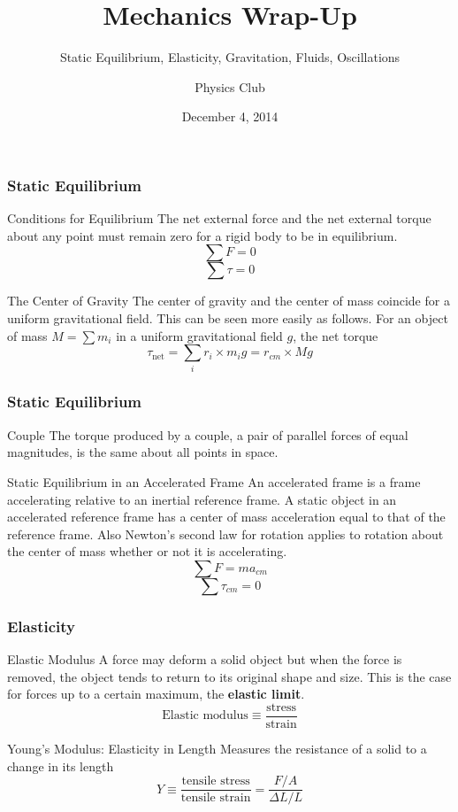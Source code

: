 \documentclass[letterpaper]{beamer}
\title{Mechanics Wrap-Up}
\subtitle{Static Equilibrium, Elasticity, Gravitation, Fluids, Oscillations}
\author{Physics Club}
\date{December 4, 2014}
\begin{document}
\frame{\titlepage}

\begin{frame}
\frametitle{Static Equilibrium}
\begin{block}{Conditions for Equilibrium}
The net external force and the net external torque about any point must remain zero for a rigid body to be in equilibrium.
$$\sum{F}=0$$
$$\sum{\tau}=0$$
\end{block}

\begin{block}{The Center of Gravity}
The center of gravity and the center of mass coincide for a uniform gravitational field. This can be seen more easily as follows. For an object of mass $M = \sum{m_i}$ in a uniform gravitational field $g$, the net torque $$\tau_\text{net}=\sum_i r_i \times m_ig = r_{cm} \times Mg$$
\end{block}
\end{frame}

\begin{frame}
\frametitle{Static Equilibrium}
\begin{block}{Couple}
The torque produced by a couple, a pair of parallel forces of equal magnitudes, is the same about all points in space.
\end{block}

\begin{block}{Static Equilibrium in an Accelerated Frame}
An accelerated frame is a frame accelerating relative to an inertial reference frame. A static object in an accelerated reference frame has a center of mass acceleration equal to that of the reference frame. Also Newton's second law for rotation applies to rotation about the center of mass whether or not it is accelerating.
$$\sum{F}=ma_{cm}$$
$$\sum{\tau_{cm}}=0$$
\end{block}
\end{frame}

\begin{frame}
\frametitle{Elasticity}

\begin{block}{Elastic Modulus}
A force may deform a solid object but when the force is removed, the object tends to return to its original shape and size. This is the case for forces up to a certain maximum, the \textbf{elastic limit}.
$$\text{Elastic modulus} \equiv \frac{\text{stress}}{\text{strain}}$$
\end{block}

\begin{block}{Young's Modulus: Elasticity in Length}
Measures the resistance of a solid to a change in its length
$$Y \equiv \frac{\text{tensile stress}}{\text{tensile strain}} = \frac{F/A}{\Delta L/L}$$
\end{block}

\end{frame}
\end{document}

